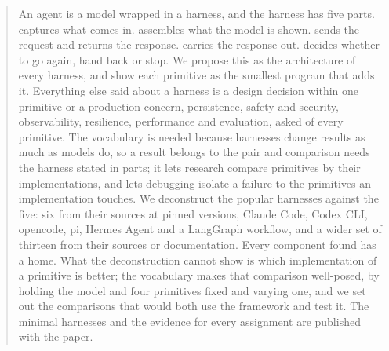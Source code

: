 \begin{abstract}
An agent is a model wrapped in a harness, and the harness has five parts.  captures what comes in.  assembles what the model is shown.  sends the request and returns the response.  carries the response out.  decides whether to go again, hand back or stop. We propose this as the architecture of every harness, and show each primitive as the smallest program that adds it. Everything else said about a harness is a design decision within one primitive or a production concern, persistence, safety and security, observability, resilience, performance and evaluation, asked of every primitive. The vocabulary is needed because harnesses change results as much as models do, so a result belongs to the pair and comparison needs the harness stated in parts; it lets research compare primitives by their implementations, and lets debugging isolate a failure to the primitives an implementation touches. We deconstruct the popular harnesses against the five: six from their sources at pinned versions, Claude Code, Codex CLI, opencode, pi, Hermes Agent and a LangGraph workflow, and a wider set of thirteen from their sources or documentation. Every component found has a home. What the deconstruction cannot show is which implementation of a primitive is better; the vocabulary makes that comparison well-posed, by holding the model and four primitives fixed and varying one, and we set out the comparisons that would both use the framework and test it. The minimal harnesses and the evidence for every assignment are published with the paper.
\end{abstract}
